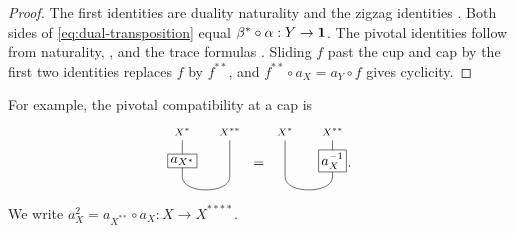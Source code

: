 \documentclass{amsart}
\begin{document}
\begin{proof}
The first identities are duality naturality and the zigzag identities
\cite[\S2.10]{EGNO15}. Both sides of \eqref{eq:dual-transposition}
equal $\beta^*\circ\alpha:Y\to{\bf 1}$. The pivotal identities follow from
naturality, \cite[Exercise~4.7.9]{EGNO15}, and the trace formulas
\cite[\S4.7]{EGNO15}. Sliding $f$ past the cup and cap by the first two
identities replaces $f$ by $f^{**}$, and $f^{**}\circ a_X=a_Y\circ f$
gives cyclicity.
\end{proof}
For example, the pivotal compatibility at a cap is
\[
\raisebox{-.7cm}{\begin{tikzpicture}[scale=.8]
\draw (0,0) node[above,font=\scriptsize] {$X^*$} -- (0,-1.15)
 .. controls (0,-1.7) and (1.5,-1.7) .. (1.5,-1.15)
 -- (1.5,0) node[above,font=\scriptsize] {$X^{**}$};
\node[draw,fill=white,inner sep=2pt] at (0,-.65) {$a_{X^*}$};
\end{tikzpicture}}
\ =\
\raisebox{-.7cm}{\begin{tikzpicture}[scale=.8]
\draw (0,0) node[above,font=\scriptsize] {$X^*$} -- (0,-1.15)
 .. controls (0,-1.7) and (1.5,-1.7) .. (1.5,-1.15)
 -- (1.5,0) node[above,font=\scriptsize] {$X^{**}$};
\node[draw,fill=white,inner sep=2pt] at (1.5,-.65) {$a_X^{-1}$};
\end{tikzpicture}}.
\]
We write $a_X^2=a_{X^{**}}\circ a_X:X\to X^{****}$.
\end{document}
